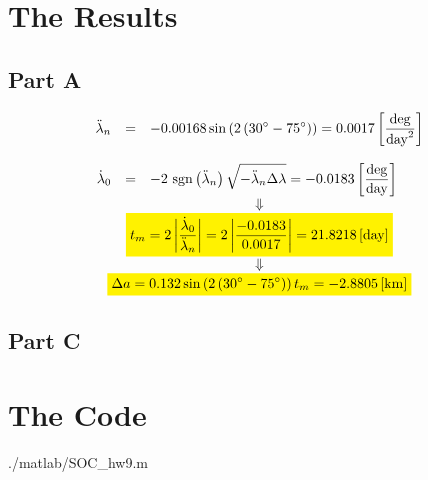 \documentclass[12pt, a4paper]{article}
\begin{document}
\newpage

\section{The Results}
\subsection{Part A}
\begin{equation}
    \begin{matrix}
        \begin{array}{rcl}
            \ddot{\lambda}_n&=&\displaystyle-0.00168\sin\left(2\left(30^\circ-75^\circ\right)\right)=0.0017\left[\frac{\mathrm{deg}}{\mathrm{day}^2}\right] \\\\
            \dot{\lambda}_0&=&\displaystyle-2\mathrm{\ sgn}\left(\ddot{\lambda}_n\right)\sqrt{-\ddot{\lambda}_n\Delta\lambda}=-0.0183\left[\frac{\mathrm{deg}}{\mathrm{day}}\right] \\
        \end{array} \\
        \Downarrow \\
        \colorbox{yellow}{$\displaystyle t_m=2\left|\frac{\dot{\lambda}_0}{\ddot{\lambda}_n}\right|=2\left|\frac{-0.0183}{0.0017}\right|=21.8218\left[\mathrm{day}\right]$} \\
        \Downarrow \\
        \colorbox{yellow}{$\displaystyle\Delta a=0.132\sin\left(2\left(30^\circ-75^\circ\right)\right)t_m=-2.8805\left[\mathrm{km}\right]$}
    \end{matrix}
\end{equation}

\subsection{Part C}

\newpage

\appendix
\section{The Code}
\begin{lstinputlisting}[captionpos=b,stringstyle=\color{magenta},frame=single, numbers=left, style=MatLab-editor, basicstyle=\mlttfamily\small, caption={The code},mlshowsectionrules=true]{./matlab/SOC_hw9.m}
\end{lstinputlisting}
\end{document}
